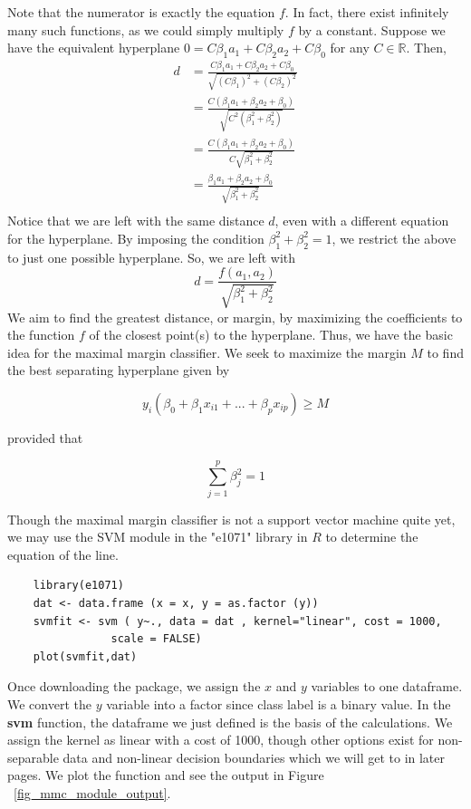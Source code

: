 \documentclass[12pt]{article}
\begin{document}
Note that the numerator is exactly the equation $f$. In fact, there exist infinitely many such functions, as we could simply multiply $f$ by a constant. Suppose we have the equivalent hyperplane $ 0=C\beta_1a_1+C\beta_2a_2+C\beta_0$ for any $C \in \mathbb{R}$. Then,
\begin{align*}
    d&= \frac{C\beta_1a_1+C\beta_2a_2+C\beta_0}{\sqrt{(C\beta_1)^2+(C\beta_2)^2}} \\
    &=\frac{C(\beta_1a_1+\beta_2a_2+\beta_0)}{\sqrt{C^2(\beta_1^2+\beta_2^2)}} \\
    &=\frac{C(\beta_1a_1+\beta_2a_2+\beta_0)}{C\sqrt{\beta_1^2+\beta_2^2}} \\
    &=\frac{\beta_1a_1+\beta_2a_2+\beta_0}{\sqrt{\beta_1^2+\beta_2^2}} \\
\end{align*}
Notice that we are left with the same distance $d$, even with a different equation for the hyperplane. By imposing the condition $\beta_1^2+\beta_2^2=1$, we restrict the above to just one possible hyperplane. So, we are left with $$d=\frac{f(a_1,a_2)}{\sqrt{\beta_1^2+\beta_2^2}}$$ We aim to find the greatest distance, or margin, by maximizing the coefficients to the function $f$ of the closest point(s) to the hyperplane. Thus, we have the basic idea for the maximal margin classifier. We seek to maximize the margin $M$ to find the best separating hyperplane given by

$$y_i(\beta_0+\beta_1x_{i1}+...+\beta_px_{ip}) \ge M$$

provided that

\begin{equation}\label{sumofsquares}
\sum_{j=1}^{p} \beta^2_j=1
\end{equation}

Though the maximal margin classifier is not a support vector machine quite yet, we may use the SVM module in the "e1071" library in $R$ to determine the equation of the line.

\begin{verbatim}
    library(e1071)
    dat <- data.frame (x = x, y = as.factor (y))
    svmfit <- svm ( y~., data = dat , kernel="linear", cost = 1000, 
                scale = FALSE)
    plot(svmfit,dat)
\end{verbatim}

Once downloading the package, we assign the $x$ and $y$ variables to one dataframe. We convert the $y$ variable into a factor since class label is a binary value. In the \textbf{svm} function, the dataframe we just defined is the basis of the calculations. We assign the kernel as linear with a cost of 1000, though other options exist for non-separable data and non-linear decision boundaries which we will get to in later pages. We plot the function and see the output in Figure ~\ref{fig_mmc_module_output}.
\end{document}

